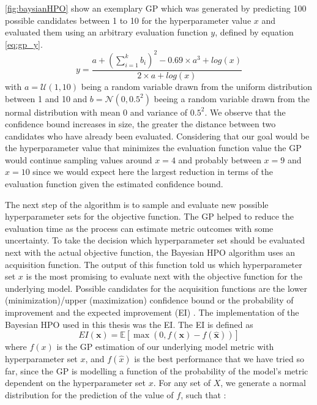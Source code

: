\documentclass[12pt,a4paper]{article}
\begin{document}
\ref{fig:baysianHPO} show an exemplary GP which was generated by predicting 100 possible candidates between 1 to 10 for the hyperparameter value \(x\) and evaluated them using an arbitrary evaluation function \(y\), defined by equation \ref{eq:gp_y}.
\begin{equation}
y = \dfrac{a + (\sum_{i=1}^k b_i)^2 - 0.69 \times a ^3 + log(x) }{2 \times a + log(x)}
\label{eq:gp_y}
\end{equation} with \(a = \mathcal{U}(1, 10)\) being a random variable drawn from the uniform distribution between 1 and 10 and \(b = \mathcal{N}(0,0.5^2)\) beeing a random variable drawn from the normal distribution with mean \(0\) and variance of \(0.5^2\). We observe that the confidence bound increases in size, the greater the distance between two candidates who have already been evaluated. Considering that our goal would be the hyperparameter value that minimizes the evaluation function value the GP would continue sampling values around \(x = 4\) and probably between \(x=9\) and \(x = 10\) since we would expect here the largest reduction in terms of the evaluation function given the estimated confidence bound.

The next step of the algorithm is to sample and evaluate new possible hyperparameter sets for the objective function. The GP helped to reduce the evaluation time as the process can estimate metric outcomes with some uncertainty. To take the decision which hyperparameter set should be evaluated next with the actual objective function, the Bayesian HPO algorithm uses an acquisition function. The output of this function told us which hyperparameter set \(x\) is the most promising to evaluate next with the objective function for the underlying model. Possible candidates for the acquisition functions are the lower (minimization)/upper (maximization) confidence bound or the probability of improvement and the expected improvement (EI) \textcite{Wilson2018}. The implementation of the Bayesian HPO used in this thesis was the EI. The EI is defined as
\begin{equation}
E I(\mathbf{x})=\mathbb{E}[\max (0, f(\mathbf{x})-f(\hat{\mathbf{x}}))]
\label{eq:exp_imp}
\end{equation} where \(f(x)\) is the GP estimation of our underlying model metric with hyperparameter set \(x\), and \(f(\hat{x})\) is the best performance that we have tried so far, since the GP is modelling a function of the probability of the model's metric dependent on the hyperparameter set \(x\). For any set of \(X\), we generate a normal distribution for the prediction of the value of \(f\), such that :
\end{document}
